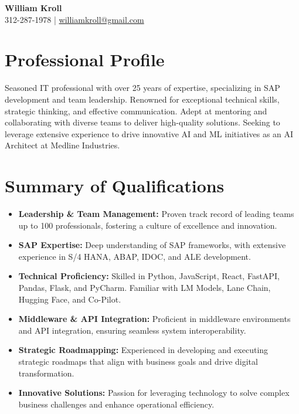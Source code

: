 \documentclass[a4paper,10pt]{article}
\begin{document}
\begin{center}
    \textbf{\huge William Kroll} \\
    312-287-1978 | \href{mailto:williamkroll@gmail.com}{williamkroll@gmail.com}
\end{center}

\section*{Professional Profile}
Seasoned IT professional with over 25 years of expertise, specializing in SAP development and team leadership. Renowned for exceptional technical skills, strategic thinking, and effective communication. Adept at mentoring and collaborating with diverse teams to deliver high-quality solutions. Seeking to leverage extensive experience to drive innovative AI and ML initiatives as an AI Architect at Medline Industries.

\section*{Summary of Qualifications}
\begin{itemize}[leftmargin=2em]
    \item \textbf{Leadership \& Team Management:} Proven track record of leading teams up to 100 professionals, fostering a culture of excellence and innovation.
    \item \textbf{SAP Expertise:} Deep understanding of SAP frameworks, with extensive experience in S/4 HANA, ABAP, IDOC, and ALE development.
    \item \textbf{Technical Proficiency:} Skilled in Python, JavaScript, React, FastAPI, Pandas, Flask, and PyCharm. Familiar with LM Models, Lane Chain, Hugging Face, and Co-Pilot.
    \item \textbf{Middleware \& API Integration:} Proficient in middleware environments and API integration, ensuring seamless system interoperability.
    \item \textbf{Strategic Roadmapping:} Experienced in developing and executing strategic roadmaps that align with business goals and drive digital transformation.
    \item \textbf{Innovative Solutions:} Passion for leveraging technology to solve complex business challenges and enhance operational efficiency.
\end{itemize}
\end{document}
